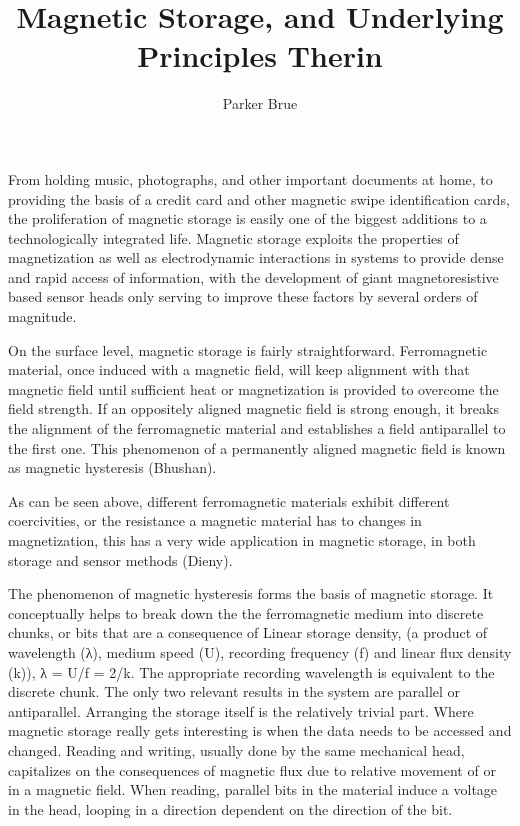 \documentclass[11pt]{article}
\title{Magnetic Storage, and Underlying Principles Therin}
\author{Parker Brue}
\begin{document}
\maketitle
\thispagestyle{fancy}

\begin{multicols}{2} %
From holding music, photographs, and other important documents at home, to providing the basis of a credit card and other magnetic swipe identification cards, the proliferation of magnetic storage is easily one of the biggest additions to a technologically integrated life. Magnetic storage exploits the properties of magnetization as well as electrodynamic interactions in systems to provide dense and rapid access of information, with the development of giant magnetoresistive based sensor heads only serving to improve these factors by several orders of magnitude.


On the surface level, magnetic storage is fairly straightforward. Ferromagnetic material, once induced with a magnetic field, will keep alignment with that magnetic field until sufficient heat or magnetization is provided to overcome the field strength. If an oppositely aligned magnetic field is strong enough, it breaks the alignment of the ferromagnetic material and establishes a field antiparallel to the first one. This phenomenon of a permanently aligned magnetic field is known as magnetic hysteresis (Bhushan).


As can be seen above, different ferromagnetic materials exhibit different coercivities, or the resistance a magnetic material has to changes in magnetization, this has a very wide application in magnetic storage, in both storage and sensor methods (Dieny).

The phenomenon of magnetic hysteresis forms the basis of magnetic storage. It conceptually helps to break down the the ferromagnetic medium into discrete chunks, or bits that are a consequence of Linear storage density, (a product of wavelength (λ), medium speed (U), recording frequency (f) and linear flux density (k)), λ = U/f = 2/k. The appropriate recording wavelength is equivalent to the discrete chunk. The only two relevant results in the system are parallel or antiparallel. Arranging the storage itself is the relatively trivial part. Where magnetic storage really gets interesting is when the data needs to be accessed and changed. Reading and writing, usually done by the same mechanical head, capitalizes on the consequences of magnetic flux due to relative movement of or in a magnetic field. When reading, parallel bits in the material induce a voltage in the head, looping in a direction dependent on the direction of the bit. 


\end{multicols}
\end{document}
